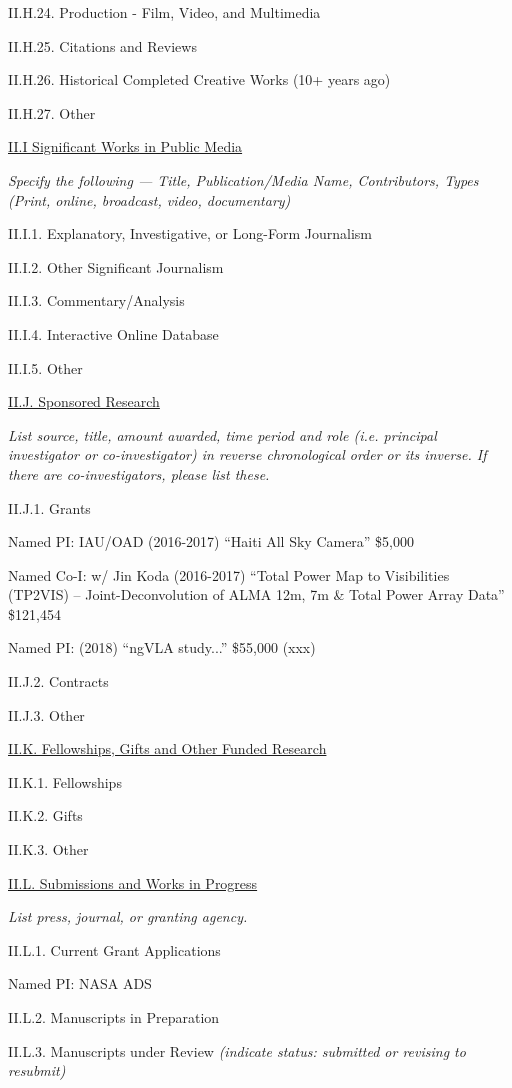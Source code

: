 \documentclass[11pt,letterpaper]{article}
\begin{document}
II.H.24. Production - Film, Video, and Multimedia

II.H.25. Citations and Reviews

II.H.26. Historical Completed Creative Works (10+ years ago)

II.H.27. Other


\underline{II.I Significant Works in Public Media}

\textit{Specify the following --- Title, Publication/Media Name, Contributors, Types (Print, online, broadcast, video, documentary)}

II.I.1. Explanatory, Investigative, or Long-Form Journalism

II.I.2. Other Significant Journalism

II.I.3. Commentary/Analysis

II.I.4. Interactive Online Database

II.I.5. Other


\underline{II.J. Sponsored Research}

\textit{List source, title, amount awarded, time period and role (i.e. principal investigator or co-investigator) in reverse chronological order or its inverse.  If there are co-investigators, please list these.}

II.J.1. Grants

Named PI: IAU/OAD (2016-2017) ``Haiti All Sky Camera''
		\$5,000

Named Co-I: w/ Jin Koda (2016-2017)
``Total Power Map to Visibilities (TP2VIS) -- Joint-Deconvolution of ALMA 12m, 7m \& Total Power Array Data''
		\$121,454

Named PI: (2018)
``ngVLA study...'' \$55,000 (xxx)

II.J.2. Contracts

II.J.3. Other


\underline{II.K. Fellowships, Gifts and Other Funded Research}

II.K.1. Fellowships

II.K.2. Gifts

II.K.3. Other


\underline{II.L. Submissions and Works in Progress}

\textit{List press, journal, or granting agency.}

II.L.1. Current Grant Applications

Named PI: NASA ADS

II.L.2. Manuscripts in Preparation

II.L.3. Manuscripts under Review \textit{(indicate status:  submitted or revising to resubmit)}
\end{document}
